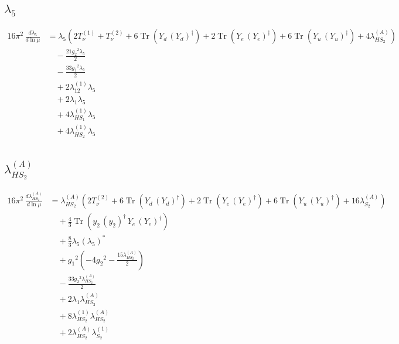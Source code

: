 \documentclass[10pt,a4paper]{article}
\begin{document}
\subsection*{$\lambda_5$}
\begin{align*}
16\pi^2\,\frac{d \lambda_5}{d\ln\mu} &={\lambda_5} (2 T_{\nu}^{(1)}+T_{\nu}^{(2)}+6 \operatorname{Tr}\!\left({Y_d}\,\left({Y_d}\right)^{\dagger}\right)+2 \operatorname{Tr}\!\left({Y_e}\,\left({Y_e}\right)^{\dagger}\right)+6 \operatorname{Tr}\!\left({Y_u}\,\left({Y_u}\right)^{\dagger}\right)+4 {\lambda_{HS_2}^{(A)}}) \\
&\quad -\frac{21 {g_2}^2 {\lambda_5}}{2} \\
&\quad -\frac{33 {g_1}^2 {\lambda_5}}{2} \\
&\quad +2 {\lambda_{12}^{(1)}} {\lambda_5} \\
&\quad +2 {\lambda_1} {\lambda_5} \\
&\quad +4 {\lambda_{HS_1}^{(1)}} {\lambda_5} \\
&\quad +4 {\lambda_{HS_2}^{(1)}} {\lambda_5} \\
\end{align*}
\subsection*{$\lambda_{HS_2}^{(A)}$}
\begin{align*}
16\pi^2\,\frac{d \lambda_{HS_2}^{(A)}}{d\ln\mu} &={\lambda_{HS_2}^{(A)}} (2 T_{\nu}^{(2)}+6 \operatorname{Tr}\!\left({Y_d}\,\left({Y_d}\right)^{\dagger}\right)+2 \operatorname{Tr}\!\left({Y_e}\,\left({Y_e}\right)^{\dagger}\right)+6 \operatorname{Tr}\!\left({Y_u}\,\left({Y_u}\right)^{\dagger}\right)+16 {\lambda_{S_2}^{(A)}}) \\
&\quad +\frac{4}{3} \operatorname{Tr}\!\left({y_2}\,\left({y_2}\right)^{\dagger}\,{Y_e}\,\left({Y_e}\right)^{\dagger}\right) \\
&\quad +\frac{8}{3} {\lambda_5} \left({\lambda_5}\right)^{*} \\
&\quad +{g_1}^2 \left(-4 {g_2}^2-\frac{15 {\lambda_{HS_2}^{(A)}}}{2}\right) \\
&\quad -\frac{33 {g_2}^2 {\lambda_{HS_2}^{(A)}}}{2} \\
&\quad +2 {\lambda_1} {\lambda_{HS_2}^{(A)}} \\
&\quad +8 {\lambda_{HS_2}^{(1)}} {\lambda_{HS_2}^{(A)}} \\
&\quad +2 {\lambda_{HS_2}^{(A)}} {\lambda_{S_2}^{(1)}} \\
\end{align*}
\end{document}

